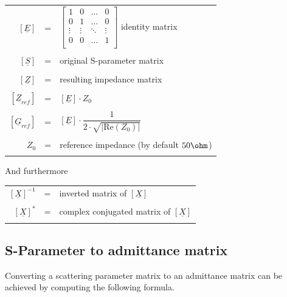 \documentclass[10pt]{report}
\begin{document}
\begin{tabular}{rll}
$\left[\underline{E}\right]$ & = &
$\begin{bmatrix}
1 & 0 & \ldots & 0\\
0 & 1 & \ldots & 0\\
\vdots & \vdots & \ddots & \vdots\\
0 & 0 & \ldots & 1\\
\end{bmatrix}$
identity matrix\\& &\\
$\left[\underline{S}\right]$ & = & original S-parameter matrix\\& &\\
$\left[\underline{Z}\right]$ & = & resulting impedance matrix\\& &\\
$\left[\underline{Z}_{ref}\right]$ & = &
$\left[\underline{E}\right] \cdot Z_{0}$\\& &\\
$\left[\underline{G}_{ref}\right]$ & = &
$\left[\underline{E}\right] \cdot 
\dfrac{1}{2\cdot \sqrt{\left| \text{Re}\left(Z_{0}\right)\right|}}$\\& &\\
$Z_{0}$ & = & reference impedance (by default $50\ohm$)\\& &\\
\end{tabular}

And furthermore

\addvspace{12pt}

\begin{tabular}{rll}
$\left[\underline{X}\right]^{-1}$ & = & 
inverted matrix of $\left[\underline{X}\right]$\\& &\\
$\left[\underline{X}\right]^{*}$ & = & 
complex conjugated matrix of $\left[\underline{X}\right]$\\& &\\
\end{tabular}

\subsection{S-Parameter to admittance matrix}

Converting a scattering parameter matrix to an admittance matrix can
be achieved by computing the following formula.
\end{document}
